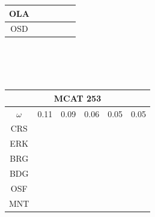 \documentclass[12pt]{article}
\begin{document}
\begin{landscape}
\begin{figure}
\begin{minipage}[c]{0.3\textwidth}
\begin{tabular}{|c|c|c|c|c|c|}
        OLA&\cellcolor[HTML]{984EA3}&\cellcolor[HTML]{4DAF4A}&\cellcolor[HTML]{984EA3}&\cellcolor[HTML]{984EA3}&\cellcolor[HTML]{984EA3}\\ \hline %
        OSD&\cellcolor[HTML]{FF7F00}&\cellcolor[HTML]{984EA3}&\cellcolor[HTML]{FF7F00}&\cellcolor[HTML]{FF7F00}&\cellcolor[HTML]{FF7F00}\\ \hline %
\end{tabular}\\$~$\\$~$\\
\hspace*{-5cm}
\begin{tabular}{|c|c|c|c|c|c|}%
         \hline \multicolumn{6}{|c|}{MCAT 253} \\ \hline
         $\omega$&0.11&0.09&0.06&0.05&0.05\\ \hline %
        CRS&\cellcolor[HTML]{E41A1C}&\cellcolor[HTML]{E41A1C}&\cellcolor[HTML]{E41A1C}&\cellcolor[HTML]{E41A1C}&\cellcolor[HTML]{E41A1C}\\ \hline %
        ERK&\cellcolor[HTML]{E41A1C}&\cellcolor[HTML]{E41A1C}&\cellcolor[HTML]{E41A1C}&\cellcolor[HTML]{377EB8}&\cellcolor[HTML]{E41A1C}\\ \hline %
        BRG&\cellcolor[HTML]{E41A1C}&\cellcolor[HTML]{377EB8}&\cellcolor[HTML]{E41A1C}&\cellcolor[HTML]{377EB8}&\cellcolor[HTML]{377EB8}\\ \hline %
        BDG&\cellcolor[HTML]{377EB8}&\cellcolor[HTML]{377EB8}&\cellcolor[HTML]{377EB8}&\cellcolor[HTML]{4DAF4A}&\cellcolor[HTML]{4DAF4A}\\ \hline %
        OSF&\cellcolor[HTML]{377EB8}&\cellcolor[HTML]{377EB8}&\cellcolor[HTML]{377EB8}&\cellcolor[HTML]{4DAF4A}&\cellcolor[HTML]{4DAF4A}\\ \hline %
        MNT&\cellcolor[HTML]{4DAF4A}&\cellcolor[HTML]{4DAF4A}&\cellcolor[HTML]{4DAF4A}&\cellcolor[HTML]{984EA3}&\cellcolor[HTML]{984EA3}\\ \hline %

\end{tabular}
\end{minipage}
\end{figure}
\end{landscape}
\end{document}
